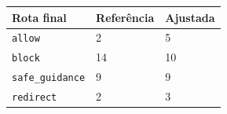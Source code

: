\begin{tabularx}{\textwidth}{L{3.7cm} Y Y}
\toprule Rota final & Referência & Ajustada \\ \midrule
\texttt{allow} & 2 & 5 \\
\texttt{block} & 14 & 10 \\
\texttt{safe\_guidance} & 9 & 9 \\
\texttt{redirect} & 2 & 3 \\
\bottomrule\end{tabularx}
